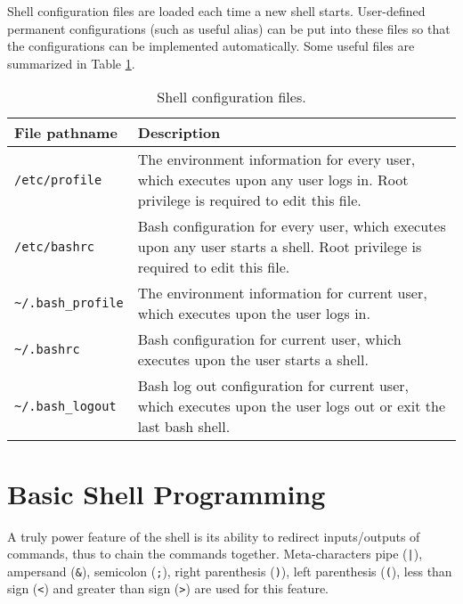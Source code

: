 Shell configuration files are loaded each time a new shell starts. User-defined permanent configurations (such as useful alias) can be put into these files so that the configurations can be implemented automatically. Some useful files are summarized in Table \ref{ch2tab:shellconfig}.

\begin{table}
	\centering \caption{Shell configuration files.}\label{ch2tab:shellconfig}
	\begin{tabularx}{\textwidth}{lX}
		\hline
		File pathname & Description \\ \hline
		\verb|/etc/profile| & The environment information for every user, which executes upon any user logs in. Root privilege is required to edit this file.  \\ \hdashline
		\verb|/etc/bashrc| & Bash configuration for every user, which executes upon any user starts a shell. Root privilege is required to edit this file. \\ \hdashline
		\verb|~/.bash_profile| & The environment information for current user, which executes upon the user logs in. \\ \hdashline
		\verb|~/.bashrc| & Bash configuration for current user, which executes upon the user starts a shell. \\ \hdashline
		\verb|~/.bash_logout| & Bash log out configuration for current user, which executes upon the user logs out or exit the last bash shell. \\ \hline
	\end{tabularx}
\end{table}











\section{Basic Shell Programming}

A truly power feature of the shell is its ability to redirect inputs/outputs of commands, thus to chain the commands together. Meta-characters pipe (\verb$|$), ampersand (\verb|&|), semicolon (\verb|;|), right parenthesis (\verb|)|), left parenthesis (\verb|(|), less than sign (\verb|<|) and greater than sign (\verb|>|) are used for this feature.






